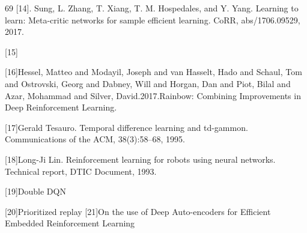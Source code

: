 \begin{thebibliography}{69}
  [14]. Sung, L. Zhang, T. Xiang, T. M. Hospedales, and Y. Yang. Learning to learn: Meta-critic networks for
sample efficient learning. CoRR, abs/1706.09529, 2017.

  [15]
  
  [16]Hessel, Matteo and Modayil, Joseph and van Hasselt, Hado and Schaul, Tom and Ostrovski, Georg and Dabney, Will and Horgan, Dan and Piot, Bilal and Azar, Mohammad and Silver, David.2017.Rainbow: Combining Improvements in Deep Reinforcement Learning.
  
  [17]Gerald Tesauro. Temporal difference learning and td-gammon. Communications of the ACM, 38(3):58–68, 1995.
  
  [18]Long-Ji Lin. Reinforcement learning for robots using neural networks. Technical report, DTIC Document, 1993.
  
  [19]Double DQN
  
  [20]Prioritized replay 
  [21]On the use of Deep Auto-encoders for Efficient Embedded Reinforcement Learning







\end{thebibliography}
